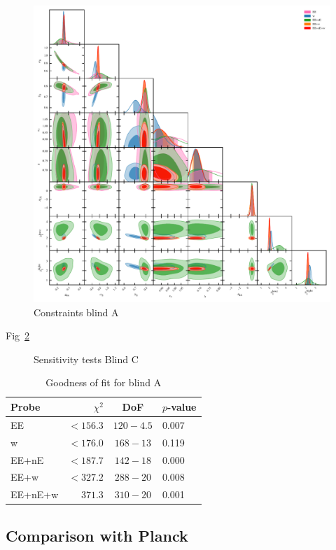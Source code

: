 \begin{figure}
	\begin{center}
		\includegraphics[width=\textwidth]{Parameter_Plots/omegam_sigma8_s8_ns_h_a_ia_b1l_b1h_blind_A}
		\caption{Constraints blind A}
		\label{fig:cosmology-params-all}
	\end{center}
\end{figure}

Fig~\ref{fig:sensitivity_tests}

\begin{figure}
	\begin{center}
		\caption{Sensitivity tests Blind C}
		\label{fig:sensitivity_tests}
	\end{center}
\end{figure}

\begin{table}
	\begin{center}
		\caption{Goodness of fit for blind A}
		\label{tab:goodness-of-fit}
\begin{tabular}{lrcl}
    \toprule
    Probe             & $\chi^2$       & DoF       & $p$-value   \\
    \midrule
	EE               & $< 156.3$ & $120-4.5$ & 0.007 \\
	w                & $< 176.0$ & $168-13$ & 0.119 \\
	EE+nE            & $< 187.7$ & $142-18$ & 0.000 \\
	EE+w             & $< 327.2$ & $288-20$ & 0.008 \\
	EE+nE+w          & $371.3$ & $310-20$ & 0.001 \\

    \bottomrule
\end{tabular}
	\end{center}
\end{table}


\subsection{Comparison with Planck}
\label{sec:planck_comp}
